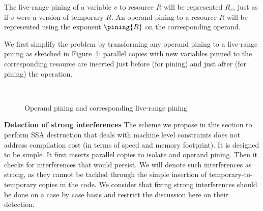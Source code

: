 The live-range pining of a variable $v$ to resource $R$ will be represented $R_v$, just as if $v$ were a version of temporary $R$. An operand pining to a resource $R$ will be represented using the exponent $\pining{R}$ on the corresponding operand. 

We first simplify the problem by transforming any operand pining to a live-range pining as sketched in Figure~\ref{fig:alternative_ssa_destruction:pining}: parallel copies with new variables pinned to the corresponding resource are inserted just before (for \useop pining) and just after (for  pining) the operation.

\begin{figure}[h]
\hfill
{}
\\
\hfill
{}
\caption{\label{fig:alternative_ssa_destruction:pining}Operand pining and corresponding live-range pining}
\end{figure}


{\bf Detection of strong interferences}
\label{par:alternative_ssa_destruction:strong}
The scheme we propose in this section to perform SSA destruction that deals with machine level constraints does not address compilation cost (in terms of speed and memory footprint). It is designed to be simple. It first inserts parallel copies to isolate \phifuns and operand pining. Then it checks for interferences that would persist. We will denote such interferences as strong, as they cannot be tackled through the simple insertion of temporary-to-temporary copies in the code. We consider that fixing strong interferences should be done on a case by case basis and restrict the discussion here on their detection.

